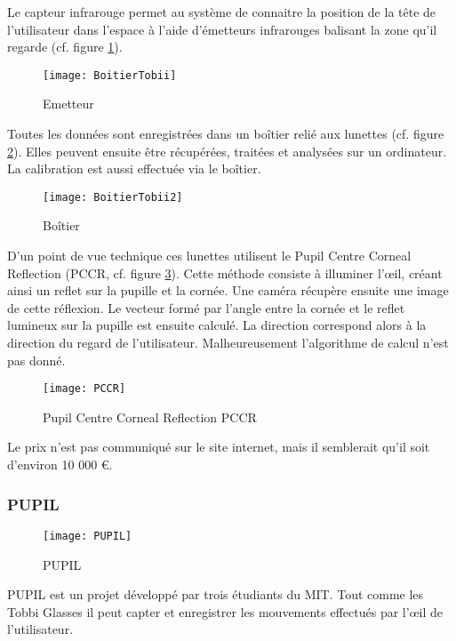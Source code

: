 Le capteur infrarouge permet au système de connaitre la position de la tête de l’utilisateur dans l’espace à l’aide d’émetteurs infrarouges balisant la zone qu'il regarde (cf. figure \ref{fig:Emetteur}).

\begin{figure}[H]
  \centering
  \texttt{[image: BoitierTobii]}
  \caption{Emetteur}
  \label{fig:Emetteur}
\end{figure}

Toutes les données sont enregistrées dans un boîtier relié aux lunettes (cf. figure \ref{fig:Boitier}). Elles peuvent ensuite être récupérées, traitées et analysées sur un ordinateur. La calibration est aussi effectuée via le boîtier.

\begin{figure}[H]
  \centering
  \texttt{[image: BoitierTobii2]}
  \caption{Boîtier}
  \label{fig:Boitier}
\end{figure}

D’un point de vue technique ces lunettes utilisent le Pupil Centre Corneal Reflection (PCCR, cf. figure \ref{fig:PCCR}). Cette méthode consiste à illuminer l’œil, créant ainsi un reflet sur la pupille et la cornée. Une caméra récupère ensuite une image de cette réflexion. Le vecteur formé par l’angle entre la cornée et le reflet lumineux sur la pupille est ensuite calculé. La direction correspond alors à la direction du regard de l’utilisateur.
Malheureusement l’algorithme de calcul n’est pas donné.

\begin{figure}[H]
  \centering
  \texttt{[image: PCCR]}
  \caption{Pupil Centre Corneal Reflection PCCR}
  \label{fig:PCCR}
\end{figure}

Le prix n’est pas communiqué sur le site internet, mais il semblerait qu’il soit d’environ 10 000 \euro{}.

\subsubsection{PUPIL}

\begin{figure}[h]
  \centering
  \texttt{[image: PUPIL]}
  \caption{PUPIL}
  \label{fig:PUPIL}
\end{figure}

PUPIL \cite{pupil} est un projet développé par trois étudiants du MIT. Tout comme les Tobbi Glasses il peut capter et enregistrer les mouvements effectués par l’œil de l’utilisateur.

